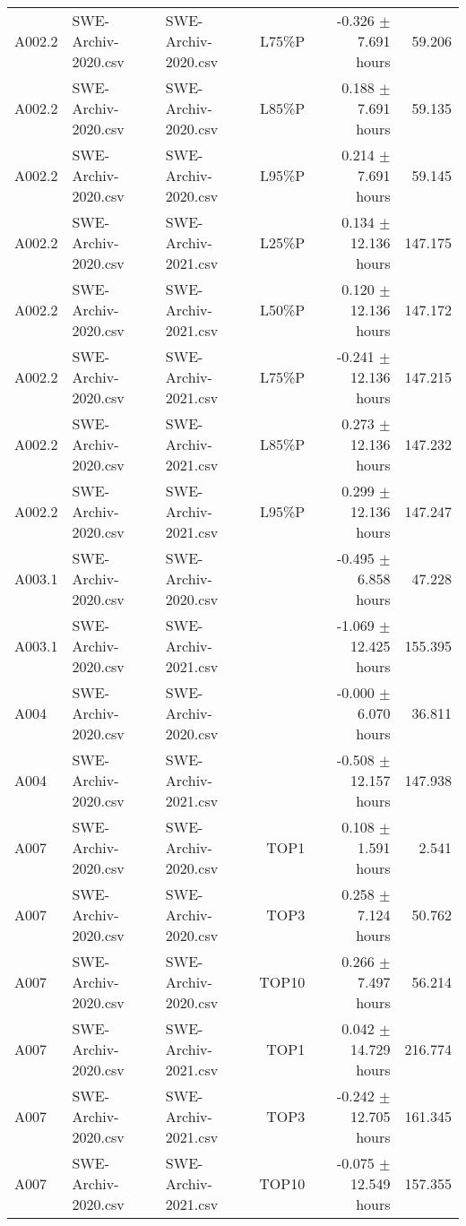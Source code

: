 \begin{longtable}{lllrrr}
 A002.2      & SWE-Archiv-2020.csv & SWE-Archiv-2020.csv &        L75\%P &  -0.326 $\pm$ 7.691 hours &  59.206 \\
 A002.2      & SWE-Archiv-2020.csv & SWE-Archiv-2020.csv &        L85\%P &   0.188 $\pm$ 7.691 hours &  59.135 \\
 A002.2      & SWE-Archiv-2020.csv & SWE-Archiv-2020.csv &        L95\%P &   0.214 $\pm$ 7.691 hours &  59.145 \\
 A002.2      & SWE-Archiv-2020.csv & SWE-Archiv-2021.csv &        L25\%P &  0.134 $\pm$ 12.136 hours & 147.175 \\
 A002.2      & SWE-Archiv-2020.csv & SWE-Archiv-2021.csv &        L50\%P &  0.120 $\pm$ 12.136 hours & 147.172 \\
 A002.2      & SWE-Archiv-2020.csv & SWE-Archiv-2021.csv &        L75\%P & -0.241 $\pm$ 12.136 hours & 147.215 \\
 A002.2      & SWE-Archiv-2020.csv & SWE-Archiv-2021.csv &        L85\%P &  0.273 $\pm$ 12.136 hours & 147.232 \\
 A002.2      & SWE-Archiv-2020.csv & SWE-Archiv-2021.csv &        L95\%P &  0.299 $\pm$ 12.136 hours & 147.247 \\
 A003.1      & SWE-Archiv-2020.csv & SWE-Archiv-2020.csv &               &  -0.495 $\pm$ 6.858 hours &  47.228 \\
 A003.1      & SWE-Archiv-2020.csv & SWE-Archiv-2021.csv &               & -1.069 $\pm$ 12.425 hours & 155.395 \\
 A004        & SWE-Archiv-2020.csv & SWE-Archiv-2020.csv &               &  -0.000 $\pm$ 6.070 hours &  36.811 \\
 A004        & SWE-Archiv-2020.csv & SWE-Archiv-2021.csv &               & -0.508 $\pm$ 12.157 hours & 147.938 \\
 A007        & SWE-Archiv-2020.csv & SWE-Archiv-2020.csv &          TOP1 &   0.108 $\pm$ 1.591 hours &   2.541 \\
 A007        & SWE-Archiv-2020.csv & SWE-Archiv-2020.csv &          TOP3 &   0.258 $\pm$ 7.124 hours &  50.762 \\
 A007        & SWE-Archiv-2020.csv & SWE-Archiv-2020.csv &         TOP10 &   0.266 $\pm$ 7.497 hours &  56.214 \\
 A007        & SWE-Archiv-2020.csv & SWE-Archiv-2021.csv &          TOP1 &  0.042 $\pm$ 14.729 hours & 216.774 \\
 A007        & SWE-Archiv-2020.csv & SWE-Archiv-2021.csv &          TOP3 & -0.242 $\pm$ 12.705 hours & 161.345 \\
 A007        & SWE-Archiv-2020.csv & SWE-Archiv-2021.csv &         TOP10 & -0.075 $\pm$ 12.549 hours & 157.355 \\
\hline
\end{longtable}